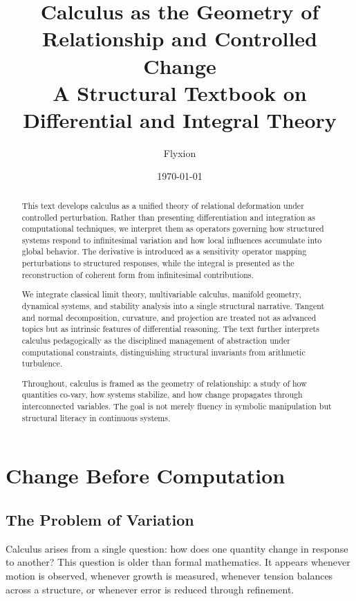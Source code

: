 \documentclass[12pt]{book}
\title{\textbf{Calculus as the Geometry of Relationship and Controlled Change}\\
A Structural Textbook on Differential and Integral Theory}
\author{Flyxion}
\date{\today}
\begin{document}
\maketitle

\begin{abstract}
This text develops calculus as a unified theory of relational deformation under controlled perturbation. Rather than presenting differentiation and integration as computational techniques, we interpret them as operators governing how structured systems respond to infinitesimal variation and how local influences accumulate into global behavior. The derivative is introduced as a sensitivity operator mapping perturbations to structured responses, while the integral is presented as the reconstruction of coherent form from infinitesimal contributions. 

We integrate classical limit theory, multivariable calculus, manifold geometry, dynamical systems, and stability analysis into a single structural narrative. Tangent and normal decomposition, curvature, and projection are treated not as advanced topics but as intrinsic features of differential reasoning. The text further interprets calculus pedagogically as the disciplined management of abstraction under computational constraints, distinguishing structural invariants from arithmetic turbulence.

Throughout, calculus is framed as the geometry of relationship: a study of how quantities co-vary, how systems stabilize, and how change propagates through interconnected variables. The goal is not merely fluency in symbolic manipulation but structural literacy in continuous systems.
\end{abstract}

\tableofcontents

\chapter{Change Before Computation}

\section{The Problem of Variation}

Calculus arises from a single question: how does one quantity change in response to another? This question is older than formal mathematics. It appears whenever motion is observed, whenever growth is measured, whenever tension balances across a structure, or whenever error is reduced through refinement.
\end{document}
